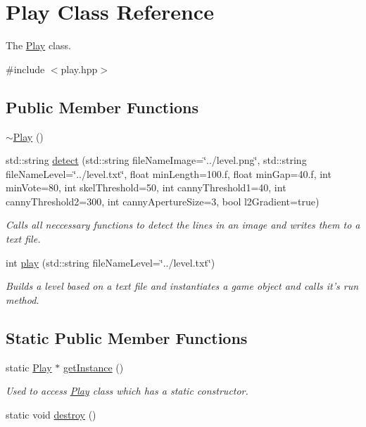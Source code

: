 \hypertarget{classPlay}{\section{Play Class Reference}
\label{classPlay}
}


The \hyperlink{classPlay}{Play} class.  




{\ttfamily \#include $<$play.\-hpp$>$}

\subsection*{Public Member Functions}
\begin{DoxyCompactItemize}
\item 
\hyperlink{classPlay_a6f7dd4d097454caef2e81fa94fe739d5}{$\sim$\-Play} ()
\item 
std\-::string \hyperlink{classPlay_a01e7b642c01dcd567185a7dbf351678e}{detect} (std\-::string file\-Name\-Image=\char`\"{}../level.\-png\char`\"{}, std\-::string file\-Name\-Level=\char`\"{}../level.\-txt\char`\"{}, float min\-Length=100.f, float min\-Gap=40.f, int min\-Vote=80, int skel\-Threshold=50, int canny\-Threshold1=40, int canny\-Threshold2=300, int canny\-Aperture\-Size=3, bool l2\-Gradient=true)
\begin{DoxyCompactList}\small\item\em Calls all neccessary functions to detect the lines in an image and writes them to a text file. \end{DoxyCompactList}\item 
int \hyperlink{classPlay_a8c5e85cf9ee9da5c1ff812aaa0558a5a}{play} (std\-::string file\-Name\-Level=\char`\"{}../level.\-txt\char`\"{})
\begin{DoxyCompactList}\small\item\em Builds a level based on a text file and instantiates a game object and calls it's run method. \end{DoxyCompactList}\end{DoxyCompactItemize}
\subsection*{Static Public Member Functions}
\begin{DoxyCompactItemize}
\item 
static \hyperlink{classPlay}{Play} $\ast$ \hyperlink{classPlay_acb42061faea4c74846f0e1ab668a6c61}{get\-Instance} ()
\begin{DoxyCompactList}\small\item\em Used to access \hyperlink{classPlay}{Play} class which has a static constructor. \end{DoxyCompactList}\item 
static void \hyperlink{classPlay_a189f1935376f3dcd47d9d05b8ff29e65}{destroy} ()
\end{DoxyCompactItemize}


